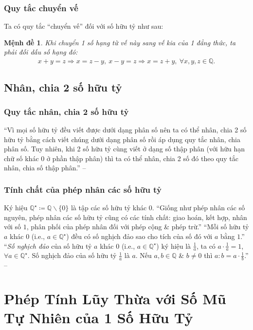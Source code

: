 \documentclass[oneside]{book}
\numberwithin{equation}{section}
\newtheorem{menhde}{Mệnh đề}[section]
\begin{document}
\subsubsection{Quy tắc chuyển vế}
Ta có quy tắc ``chuyển vế'' đối với số hữu tỷ như sau:

\begin{menhde}
	Khi chuyển 1 số hạng từ vế này sang vế kia của 1 đẳng thức, ta phải đối dấu số hạng đó:
	\begin{align*}
		x + y = z\Rightarrow x = z - y,\ x - y = z\Rightarrow x = z + y,\ \forall x,y,z\in\mathbb{Q}.
	\end{align*}
\end{menhde}

\subsection{Nhân, chia 2 số hữu tỷ}

\subsubsection{Quy tắc nhân, chia 2 số hữu tỷ}
``Vì mọi số hữu tỷ đều viết được dưới dạng phân số nên ta có thể nhân, chia 2 số hữu tỷ bằng cách viết chúng dưới dạng phân số rồi áp dụng quy tắc nhân, chia phân số. Tuy nhiên, khi 2 số hữu tỷ cùng viết ở dạng số thập phân (với hữu hạn chữ số khác $0$ ở phần thập phân) thì ta có thể nhân, chia 2 số đó theo quy tắc nhân, chia số thập phân.'' -- \cite[p. 14]{SGK_Toan_7_Canh_Dieu_tap_1}

\subsubsection{Tính chất của phép nhân các số hữu tỷ}
Ký hiệu $\mathbb{Q}^\star\coloneqq\mathbb{Q}\backslash\{0\}$ là tập các số hữu tỷ khác $0$. ``Giống như phép nhân các số nguyên, phép nhân các số hữu tỷ cũng có các tính chất: giao hoán, kết hợp, nhân với số $1$, phân phối của phép nhân đối với phép cộng \& phép trừ.'' ``Mỗi số hữu tỷ $a$ khác $0$ (i.e., $a\in\mathbb{Q}^\star$) đều có số nghịch đảo sao cho tích của số đó với $a$ bằng $1$.'' ``\textit{Số nghịch đảo} của số hữu tỷ $a$ khác $0$ (i.e., $a\in\mathbb{Q}^\star$) ký hiệu là $\frac{1}{a}$, ta có $a\cdot\frac{1}{a} = 1$, $\forall a\in\mathbb{Q}^\star$. Số nghịch đảo của số hữu tỷ $\frac{1}{a}$ là $a$. Nếu $a,b\in\mathbb{Q}$ \& $b\ne 0$ thì $a:b = a\cdot\frac{1}{b}$.'' -- \cite[p. 15]{SGK_Toan_7_Canh_Dieu_tap_1}

\section{Phép Tính Lũy Thừa với Số Mũ Tự Nhiên của 1 Số Hữu Tỷ}
\end{document}
